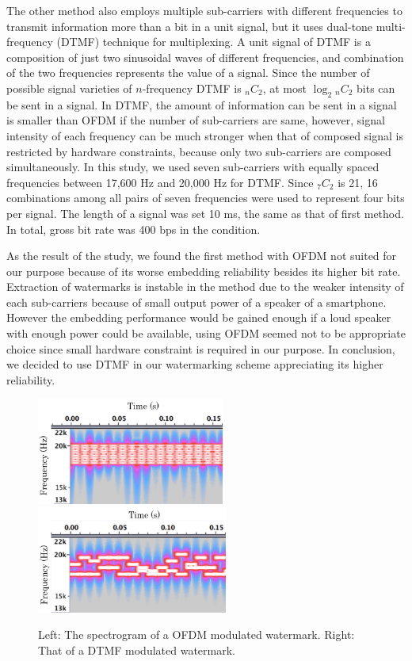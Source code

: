 The other method also employs multiple sub-carriers with different frequencies to transmit information more than a bit in a unit signal, but it uses dual-tone multi-frequency (DTMF) technique for multiplexing.
A unit signal of DTMF is a composition of just two sinusoidal waves of different frequencies, and combination of the two frequencies represents the value of a signal.
Since the number of possible signal varieties of $n$-frequency DTMF is $_n C _2$, at most $\log_2 {}_n C _2$ bits can be sent in a signal.
In DTMF, the amount of information can be sent in a signal is smaller than OFDM if the number of sub-carriers are same, however, signal intensity of each frequency can be much stronger when that of composed signal is restricted by hardware constraints, because only two sub-carriers are composed simultaneously.
In this study, we used seven sub-carriers with equally spaced frequencies between 17,600 Hz and 20,000 Hz for DTMF. Since $_7 C _2$ is 21, 16 combinations among all pairs of seven frequencies were used to represent four bits per signal.
The length of a signal was set 10 ms, the same as that of first method.
In total, gross bit rate was 400 bps in the condition.

As the result of the study, we found the first method with OFDM not suited for our purpose because of its worse embedding reliability besides its higher bit rate.
Extraction of watermarks is instable in the method due to the weaker intensity of each sub-carriers because of small output power of a speaker of a smartphone.
However the embedding performance would be gained enough if a loud speaker with enough power could be available, using OFDM seemed not to be appropriate choice since small hardware constraint is required in our purpose.
In conclusion, we decided to use DTMF in our watermarking scheme appreciating its higher reliability.

\begin{figure}[htbp]
 \begin{center}
  \includegraphics[height=35mm]{watermarking_ofdm.png}
  \hspace{5mm}
  \includegraphics[height=35mm]{watermarking_dtmf.png}
 \end{center}
 \caption{Left: The spectrogram of a OFDM modulated watermark. Right: That of a DTMF modulated watermark.}
 \label{fig:watr_comp}
\end{figure}
